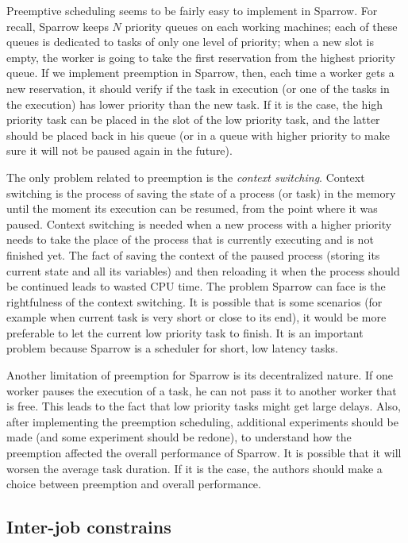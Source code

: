 \documentclass[11pt]{article}
\begin{document}
		Preemptive scheduling seems to be fairly easy to implement in Sparrow. For recall, Sparrow keeps $N$ priority queues on each working machines; each of these queues is dedicated to tasks of only one level of priority; when a new slot is empty, the worker is going to take the first reservation from the highest priority queue. If we implement preemption in Sparrow, then, each time a worker gets a new reservation, it should verify if the task in execution (or one of the tasks in the execution) has lower priority than the new task. If it is the case, the high priority task can be placed in the slot of the low priority task, and the latter should be placed back in his queue (or in a queue with higher priority to make sure it will not be paused again in the future).
		
		The only problem related to preemption is the \textit{context switching}. Context switching is the process of saving the state of a process (or task) in the memory until the moment its execution can be resumed, from the point where it was paused. Context switching is needed when a new process with a higher priority needs to take the place of the process that is currently executing and is not finished yet. The fact of saving the context of the paused process (storing its current state and all its variables) and then reloading it when the process should be continued leads to wasted CPU time. The problem Sparrow can face is the rightfulness of the context switching. It is possible that is some scenarios (for example when current task is very short or close to its end), it would be more preferable to let the current low priority task to finish. It is an important problem because Sparrow is a scheduler for short, low latency tasks.
		
		Another limitation of preemption for Sparrow is its decentralized nature. If one worker pauses the execution of a task, he can not pass it to another worker that is free. This leads to the fact that low priority tasks might get large delays. Also, after implementing the preemption scheduling, additional experiments should be made (and some experiment should be redone), to understand how the preemption affected the overall performance of Sparrow. It is possible that it will worsen the average task duration. If it is the case, the authors should make a choice between preemption and overall performance.
		
		
	\subsection{Inter-job constrains}
	
\end{document}
